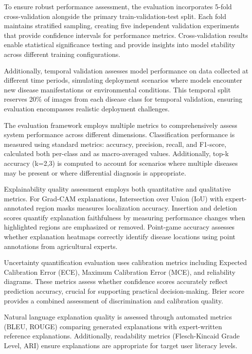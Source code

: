 \documentclass[agriculture,article,submit,pdftex,moreauthors]{Definitions/mdpi}
\begin{document}
To ensure robust performance assessment, the evaluation incorporates 5-fold cross-validation alongside the primary train-validation-test split. Each fold maintains stratified sampling, creating five independent validation experiments that provide confidence intervals for performance metrics. Cross-validation results enable statistical significance testing and provide insights into model stability across different training configurations.

Additionally, temporal validation assesses model performance on data collected at different time periods, simulating deployment scenarios where models encounter new disease manifestations or environmental conditions. This temporal split reserves 20\% of images from each disease class for temporal validation, ensuring evaluation encompasses realistic deployment challenges.


The evaluation framework employs multiple metrics to comprehensively assess system performance across different dimensions. Classification performance is measured using standard metrics: accuracy, precision, recall, and F1-score, calculated both per-class and as macro-averaged values. Additionally, top-k accuracy (k=2,3) is computed to account for scenarios where multiple diseases may be present or where differential diagnosis is appropriate.

Explainability quality assessment employs both quantitative and qualitative metrics. For Grad-CAM explanations, Intersection over Union (IoU) with expert-annotated region masks measures localization accuracy. Insertion and deletion scores quantify explanation faithfulness by measuring performance changes when highlighted regions are emphasized or removed. Point-game accuracy assesses whether explanation heatmaps correctly identify disease locations using point annotations from agricultural experts.

Uncertainty quantification evaluation uses calibration metrics including Expected Calibration Error (ECE), Maximum Calibration Error (MCE), and reliability diagrams. These metrics assess whether confidence scores accurately reflect prediction accuracy, crucial for supporting practical decision-making. Brier score provides a combined assessment of discrimination and calibration quality.

Natural language explanation quality is assessed through automated metrics (BLEU, ROUGE) comparing generated explanations with expert-written reference explanations. Additionally, readability metrics (Flesch-Kincaid Grade Level, ARI) ensure explanations are appropriate for target user literacy levels.
\end{document}
